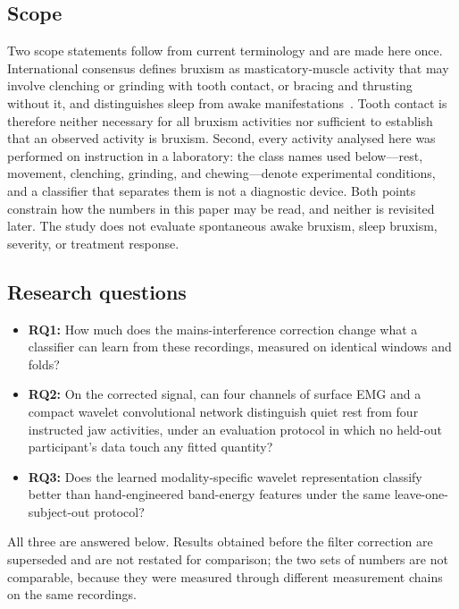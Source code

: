 \documentclass[pdflatex,sn-nature,iicol]{sn-jnl}
\begin{document}
\subsection*{Scope}

Two scope statements follow from current terminology and are made here once. International consensus defines bruxism as masticatory-muscle activity that may involve clenching or grinding with tooth contact, or bracing and thrusting without it, and distinguishes sleep from awake manifestations~\cite{lobbezoo2018international,verhoeff2025definitions}. Tooth contact is therefore neither necessary for all bruxism activities nor sufficient to establish that an observed activity is bruxism. Second, every activity analysed here was performed on instruction in a laboratory: the class names used below---rest, movement, clenching, grinding, and chewing---denote experimental conditions, and a classifier that separates them is not a diagnostic device. Both points constrain how the numbers in this paper may be read, and neither is revisited later. The study does not evaluate spontaneous awake bruxism, sleep bruxism, severity, or treatment response.

\subsection*{Research questions}

\begin{itemize}
    \item \textbf{RQ1:} How much does the mains-interference correction change what a classifier can learn from these recordings, measured on identical windows and folds?
    \item \textbf{RQ2:} On the corrected signal, can four channels of surface EMG and a compact wavelet convolutional network distinguish quiet rest from four instructed jaw activities, under an evaluation protocol in which no held-out participant's data touch any fitted quantity?
    \item \textbf{RQ3:} Does the learned modality-specific wavelet representation classify better than hand-engineered band-energy features under the same leave-one-subject-out protocol?
\end{itemize}

All three are answered below. Results obtained before the filter correction are superseded and are not restated for comparison; the two sets of numbers are not comparable, because they were measured through different measurement chains on the same recordings.
\end{document}
